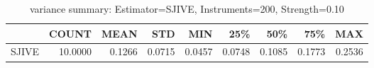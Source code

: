 \begin{table}[ht]
\centering
\caption{variance summary: Estimator=SJIVE, Instruments=200, Strength=0.10}
\begin{tabular}{lrrrrrrrr}
\toprule
 & COUNT & MEAN & STD & MIN & 25\% & 50\% & 75\% & MAX \\
\midrule
SJIVE & 10.0000 & 0.1266 & 0.0715 & 0.0457 & 0.0748 & 0.1085 & 0.1773 & 0.2536 \\
\bottomrule
\end{tabular}
\end{table}
